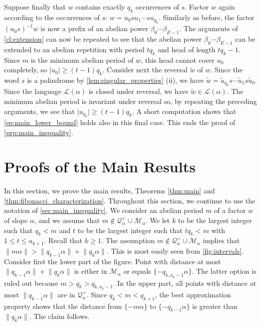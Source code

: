 \documentclass[a4paper,fleqn]{article}
\providecommand{\abs}[1]{\lvert#1\rvert}
\providecommand{\norm}[1]{\lVert#1\rVert}
\newcommand{\Lang}[2][]{\mathcal{L}_{#1}(#2)}
\newcommand{\mirror}[1]{\widetilde{#1}}
\newcommand{\qkl}[1]{\mathcal{Q}^+_{#1}}
\begin{document}
  Suppose finally that $w$ contains exactly $q_k$ occurrences of $s$. Factor $w$ again according to the occurrences of
  $s$: $w = u_0 s u_1 \cdots s u_{q_k}$. Similarly as before, the factor $(u_0 s)^{-1} w$ is now a prefix of an abelian
  power $\beta_0 \cdots \beta_{E-1}$. The arguments of \autoref{cl:extension} can now be repeated to see that the
  abelian power $\beta_0 \cdots \beta_{E-1}$ can be extended to an abelian repetition with period $tq_k$ and head of
  length $tq_k - 1$. Since $m$ is the minimum abelian period of $w$, this head cannot cover $u_0$ completely, so
  $\abs{u_0} \geq (t - 1)q_k$. Consider next the reversal $\mirror{w}$ of $w$. Since the word $s$ is a palindrome by
  \autoref{lem:singular_properties} (ii), we have $\mirror{w} = \mirror{u}_{q_k} s \cdots \mirror{u}_1 s \mirror{u}_0$.
  Since the language $\Lang{\alpha}$ is closed under reversal, we have $\mirror{w} \in \Lang{\alpha}$. The minimum
  abelian period is invariant under reversal so, by repeating the preceding arguments, we see that
  $\abs{u_{q_k}} \geq (t - 1)q_k$. A short computation shows that \eqref{eq:main_lower_bound} holds also in this final
  case. This ends the proof of \autoref{prp:main_inequality}.

  \section{Proofs of the Main Results}\label{sec:main_proofs}
  In this section, we prove the main results, Theorems \ref{thm:main} and \ref{thm:fibonacci_characterization}.
  Throughout this section, we continue to use the notation of \autoref{sec:main_inequality}. We consider an abelian
  period $m$ of a factor $w$ of slope $\alpha$, and we assume that $m \notin \qkl{\alpha} \cup \mathcal{M}_\alpha$. We
  let $k$ to be the largest integer such that $q_k < m$ and $t$ to be the largest integer such that $tq_k < m$ with
  $1 \leq t \leq a_{k+1}$. Recall that $k \geq 1$. The assumption $m \notin \qkl{\alpha} \cup \mathcal{M}_\alpha$
  implies that $\norm{m\alpha} > \norm{q_{k-1}\alpha} + \norm{q_k\alpha}$. This is most easily seen from
  \autoref{fig:intervals}. Consider first the lower part of the figure. Point with distance at most 
  $\norm{q_{k-1}\alpha} + \norm{q_k\alpha}$ is either in $\mathcal{M}_\alpha$ or equals $\{-q_{k,a_k-1}\alpha\}$. The
  latter option is ruled out because $m > q_k > q_{k,a_k-1}$. In the upper part, all points with distance at most
  $\norm{q_{k-1}\alpha}$ are in $\qkl{\alpha}$. Since $q_k < m < q_{k+1}$, the best approximation property shows that
  the distance from $\{-m\alpha\}$ to $\{-q_{k-1}\alpha\}$ is greater than $\norm{q_k\alpha}$. The claim follows.
\end{document}
